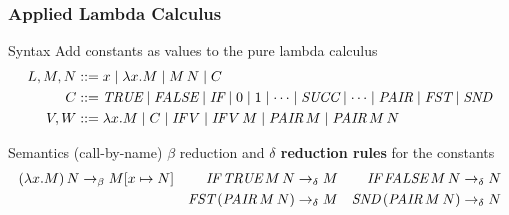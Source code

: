\documentclass[pdftex,aspectratio=169]{beamer}
\begin{document}
\begin{frame}[fragile]
  \frametitle{Applied Lambda Calculus}
  \begin{block}{Syntax}
    Add constants as values to the pure lambda calculus
    \begin{align*}
      L, M, N &::= x \mid \lambda x.M \mid M\, N \mid C\\
      C    &::= \TRUE \mid \FALSE \mid \IF 
           \mid 0 \mid 1 \mid \dots \mid \SUCC \mid \dots 
           \mid \PAIR \mid \FST \mid \SND \\
      V,W  &::=  \lambda x.M \mid C
           \mid \IF\,V \mid  \IF\,V\,M %
           \mid \PAIR\, M \mid \PAIR\, M\, N
    \end{align*}
  \end{block}
  \begin{block}{Semantics (call-by-name)}
    $\beta$ reduction and \textbf{$\delta$ reduction rules} for the constants
    \begin{align*}
      (\lambda x.M)\,N \rightarrow_\beta M[x \mapsto N]
      &&
      \textit{IF}\,\textit{TRUE}\,M\,N \rightarrow_\delta M
      &&
      \textit{IF}\,\textit{FALSE}\,M\,N \rightarrow_\delta N
      \\
      &&
      \textit{FST}\,(\textit{PAIR}\,M\,N) \rightarrow_\delta M
      &&
      \textit{SND}\,(\textit{PAIR}\,M\,N) \rightarrow_\delta N
    \end{align*}
  \end{block}
\end{frame}             
\end{document}
